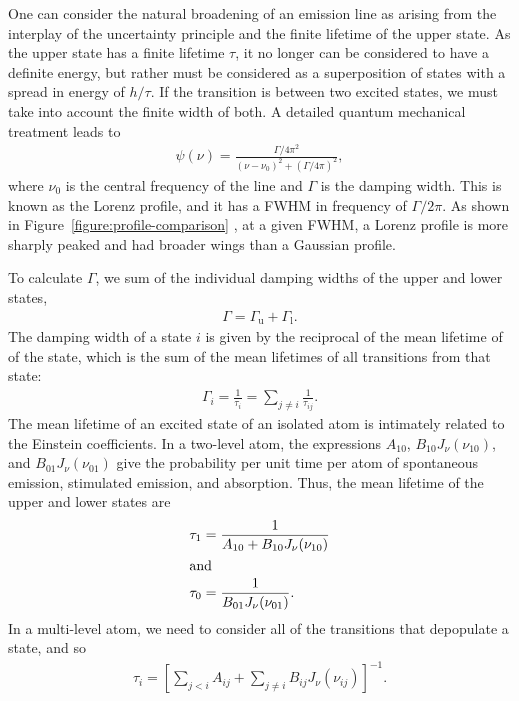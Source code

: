 One can consider the natural broadening of an emission line
as arising from the interplay of the uncertainty principle
and the finite lifetime of the upper state. As the upper
state has a finite lifetime $\tau$, it no longer can be
considered to have a definite energy, but rather must be
considered as a superposition of states with a spread in
energy of $h / \tau$. If the transition is between two
excited states, we must take into account the finite width
of both. A detailed quantum mechanical treatment leads to
\begin{align}
\psi(\nu) = \frac{\Gamma / 4\pi^2}{(\nu - \nu_0)^2 +
(\Gamma/4\pi)^2},
\end{align}
where $\nu_0$ is the central frequency of the line and
$\Gamma$ is the damping width. This is known as the Lorenz
profile, and it has a FWHM in frequency of $\Gamma/2\pi$. As shown in Figure~\ref{figure:profile-comparison}
, at a given FWHM, a
Lorenz profile is more sharply peaked and had broader wings
than a Gaussian profile.

To calculate $\Gamma$, we sum of
the individual damping widths of the upper and lower states,
\begin{align}
\Gamma = \Gamma_\mathrm{u} + \Gamma_\mathrm{l}.
\end{align}
The damping width of a state $i$ is given by the
reciprocal of the mean lifetime of of the state, which is the sum of the mean lifetimes of all transitions from that state:
\begin{align}
\Gamma_i = \frac{1}{\tau_i} = \sum_{j \ne i} \frac{1}{\tau_{ij}}.
\end{align}
The mean lifetime of an excited state of an isolated atom is intimately
related to the Einstein coefficients. In a two-level atom, the
expressions $A_{10}$, $B_{10}J_\nu(\nu_{10})$, and
$B_{01}J_\nu(\nu_{01})$ give the probability per unit time per atom of
spontaneous emission, stimulated emission, and absorption. Thus, the
mean lifetime of the upper and lower states are
\begin{align}
\tau_1 &= \frac{1}{A_{10} + B_{10}J_\nu(\nu_{10})}\\
\intertext{and}
\tau_0 &= \frac{1}{B_{01}J_\nu(\nu_{01})}.
\end{align}
In a multi-level atom, we need to consider all of the transitions that
depopulate a state, and so
\begin{align}
\tau_i = \left[\sum_{j<i}A_{ij} + \sum_{j \ne i}B_{ij}J_\nu(\nu_{ij})\right]^{-1}.
\end{align}


